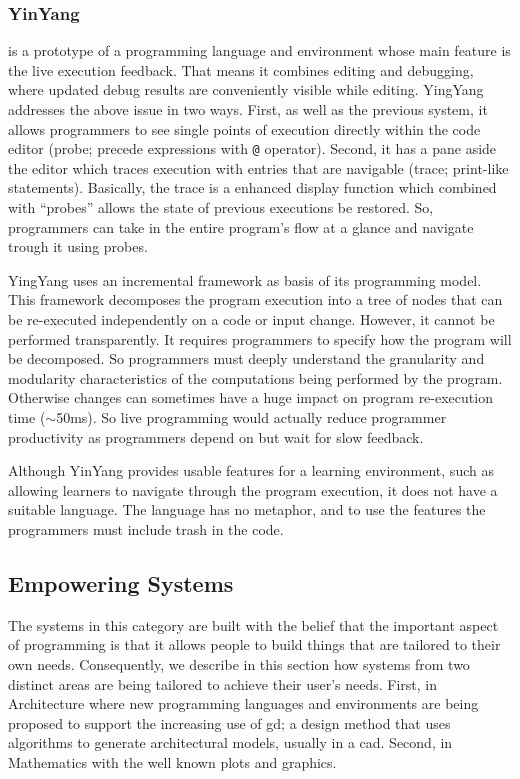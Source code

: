 \subsubsection{YinYang~\cite{mcdirmid2013usable}} is a prototype of a programming language and environment whose main feature is the live execution feedback. That means it combines editing and debugging, where updated debug results are conveniently visible while editing. YingYang addresses the above issue in two ways. First, as well as the previous system, it allows programmers to see single points of execution directly within the code editor (probe; precede expressions with \texttt{@} operator). Second, it has a pane aside the editor which traces execution with entries that are navigable (trace; print-like statements). Basically, the trace is a enhanced display function which combined with ``probes'' allows the state of previous executions be restored. So, programmers can take in the entire program's flow at a glance and navigate trough it using probes.

YingYang uses an incremental framework as basis of its programming model. This framework decomposes the program execution into a tree of nodes that can be re-executed independently on a code or input change. However, it cannot be performed transparently. It requires programmers to specify how the program will be decomposed. So programmers must deeply understand the granularity and modularity characteristics of the computations being performed by the program. Otherwise changes can sometimes have a huge impact on program re-execution time ($\sim$50ms). So live programming would actually reduce programmer productivity as programmers depend on but wait for slow feedback.

Although YinYang provides usable features for a learning environment, such as allowing learners to navigate through the program execution, it does not have a suitable language. The language has no metaphor, and to use the features the programmers must include trash in the code. 

\subsection{Empowering Systems}

The systems in this category are built with the belief that the important aspect of programming is that it allows people to build things that are tailored to their own needs. Consequently, we describe in this section how systems from two distinct areas are being tailored to achieve their user's needs. First, in Architecture where new programming languages and environments are being proposed to support the increasing use of \ac{gd}; a design method that uses algorithms to generate architectural models, usually in a \ac{cad}. Second, in Mathematics with the well known plots and graphics. 

